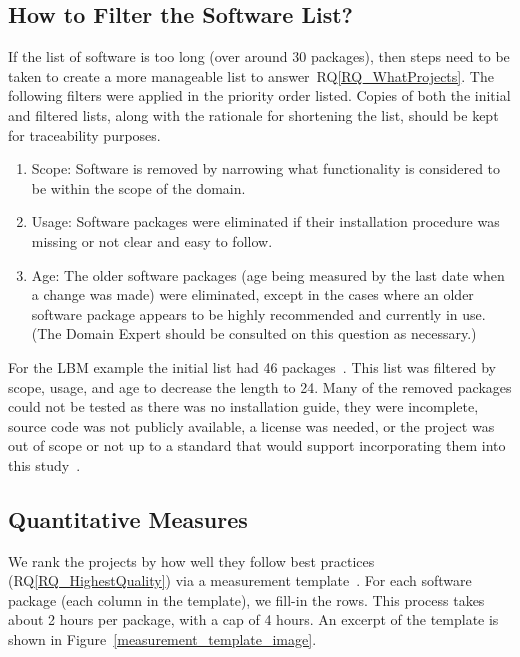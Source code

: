 \documentclass[runningheads]{llncs}
\newcommand{\rqref}[1]{RQ\ref{#1}}
\begin{document}
\subsection{How to Filter the Software List?} \label{filtersoftware}

If the list of software is too long (over around 30 packages), then steps need
to be taken to create a more manageable list to answer~\rqref{RQ_WhatProjects}.
The following filters were applied in the priority order listed. Copies of both
the initial and filtered lists, along with the rationale for shortening the
list, should be kept for traceability purposes.

\begin{enumerate}
	\item Scope: Software is removed by narrowing what functionality is
	considered to be within the scope of the domain.
	\item Usage: Software packages were eliminated if their installation
	procedure was missing or not clear and easy to follow.
	\item Age: The older software packages (age being measured by the last date
	when a change was made) were eliminated, except in the cases where an older
	software package appears to be highly recommended and currently in use. (The
	Domain Expert should be consulted on this question as necessary.)
\end{enumerate}

For the LBM example the initial list had 46 packages~\cite{Michalski2021}. This
list was filtered by scope, usage, and age to decrease the length to 24. Many of
the removed packages could not be tested as there was no installation guide,
they were incomplete, source code was not publicly available, a license was
needed, or the project was out of scope or not up to a standard that would
support incorporating them into this study~\cite{Michalski2021}.

\subsection{Quantitative Measures} \label{empiricalmeasures}

We rank the projects by how well they follow best practices
(\rqref{RQ_HighestQuality}) via a measurement template~\cite{SmithEtAl2021}. For
each software package (each column in the template), we fill-in the rows. This
process takes about 2 hours per package, with a cap of 4 hours.  An excerpt of
the template is shown in Figure~\ref{measurement_template_image}.
\end{document}
